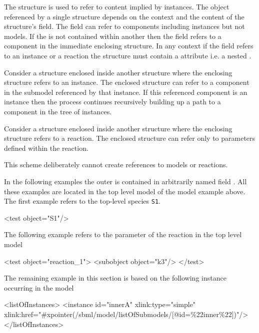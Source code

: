 \documentclass{cekarticle}
\begin{document}
The  structure is used to refer to content implied by instances.  The object referenced by a single 
structure depends on the context and the content of the structure's 
field.  
The  field can refer to components including 
instances but not models.  
If the  is not contained within another
 then the  field refers to a component in the
immediate enclosing  structure.  In any context if the 
field refers to an instance or a reaction the  structure must
contain a  attribute i.e. a nested .

Consider a  structure enclosed inside another 
structure where the enclosing structure refers to an instance.
The enclosed structure can refer to a component in the
submodel referenced by that instance.  If this referenced component is an
instance then the process continues recursively building up a path to a component
in the tree of instances.

Consider a  structure enclosed inside another 
structure where the enclosing structure refers to a reaction.
The enclosed structure can refer only to parameters defined within the reaction.

This scheme deliberately cannot create references to models or reactions.

In the following examples the outer  is contained in arbitrarily
named field .  All these examples are located in the top level model
of the model example above.  The first example refers to the top-level
species \texttt{S1}.

\begin{example}
<test object="S1"/>
\end{example}

The following example refers to the parameter of the reaction in the top level model

\begin{example}
<test object="reaction_1">
    <subobject object="k3"/>
</test>
\end{example}

The remaining example in this section is based on the following instance occurring in the model

\begin{example}
<listOfInstances>
    <instance
        id="innerA" 
        xlink:type="simple" 
        xlink:href="#xpointer(/sbml/model/listOfSubmodels/[@id=\%22inner\%22])"/>
</listOfInstances>
\end{example}
\end{document}
